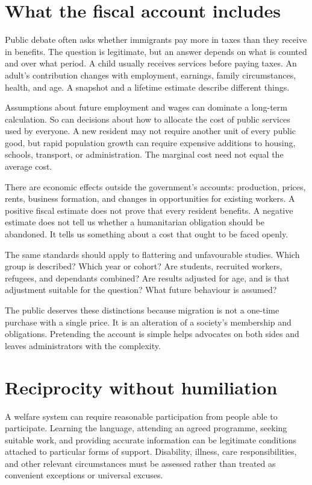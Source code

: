 \documentclass[12pt,a4paper]{book}
\begin{document}
\section*{What the fiscal account includes}

Public debate often asks whether immigrants pay more in taxes than they receive in benefits. The question is legitimate, but an answer depends on what is counted and over what period. A child usually receives services before paying taxes. An adult's contribution changes with employment, earnings, family circumstances, health, and age. A snapshot and a lifetime estimate describe different things.

Assumptions about future employment and wages can dominate a long-term calculation. So can decisions about how to allocate the cost of public services used by everyone. A new resident may not require another unit of every public good, but rapid population growth can require expensive additions to housing, schools, transport, or administration. The marginal cost need not equal the average cost.

There are economic effects outside the government's accounts: production, prices, rents, business formation, and changes in opportunities for existing workers. A positive fiscal estimate does not prove that every resident benefits. A negative estimate does not tell us whether a humanitarian obligation should be abandoned. It tells us something about a cost that ought to be faced openly.

The same standards should apply to flattering and unfavourable studies. Which group is described? Which year or cohort? Are students, recruited workers, refugees, and dependants combined? Are results adjusted for age, and is that adjustment suitable for the question? What future behaviour is assumed?

The public deserves these distinctions because migration is not a one-time purchase with a single price. It is an alteration of a society's membership and obligations. Pretending the account is simple helps advocates on both sides and leaves administrators with the complexity.

\section*{Reciprocity without humiliation}

A welfare system can require reasonable participation from people able to participate. Learning the language, attending an agreed programme, seeking suitable work, and providing accurate information can be legitimate conditions attached to particular forms of support. Disability, illness, care responsibilities, and other relevant circumstances must be assessed rather than treated as convenient exceptions or universal excuses.
\end{document}
